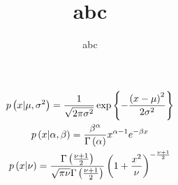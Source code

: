 \documentclass[a4paper,10pt]{scrartcl}
\title{abc}
\author{abc}
\begin{document}
\maketitle

\begin{gather*}
  \fun{p}{x | \mu, \sigma^2} = \dgauss{x}{\mu}{\sigma^2} \\
  \fun{p}{x | \alpha, \beta} = \dgamma{x}{\alpha}{\beta} \\
  \fun{p}{x | \nu} = \dt{x}{\nu} \\
\end{gather*}
\end{document}

